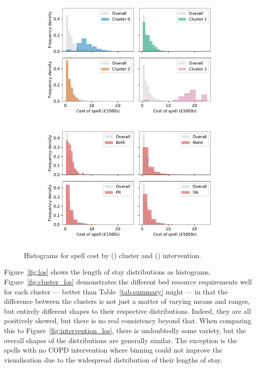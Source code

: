 \begin{figure}
    \centering
    \begin{subfigure}{.5\imgwidth}
        \includegraphics[width=\linewidth]{cluster_spell_cost}
        \caption{}\label{fig:cluster_cost}
    \end{subfigure}\hfill%
    \begin{subfigure}{.5\imgwidth}
        \includegraphics[width=\linewidth]{intervention_spell_cost}
        \caption{}\label{fig:intervention_cost}
    \end{subfigure}
    \caption{%
        Histograms for spell cost by () cluster and
        () intervention.
    }\label{fig:cost}
\end{figure}

Figure~\ref{fig:los} shows the length of stay distributions as histograms.
Figure~\ref{fig:cluster_los} demonstrates the different bed resource
requirements well for each cluster --- better than Table~\ref{tab:summary} might
--- in that the difference between the clusters is not just a matter of
varying means and ranges, but entirely different shapes to their respective
distributions. Indeed, they are all positively skewed, but there is no real
consistency beyond that. When comparing this to
Figure~\ref{fig:intervention_los}, there is undoubtedly some variety, but the
overall shapes of the distributions are generally similar. The exception is the
spells with no COPD intervention where binning could not improve the
visualisation due to the widespread distribution of their lengths of stay.

